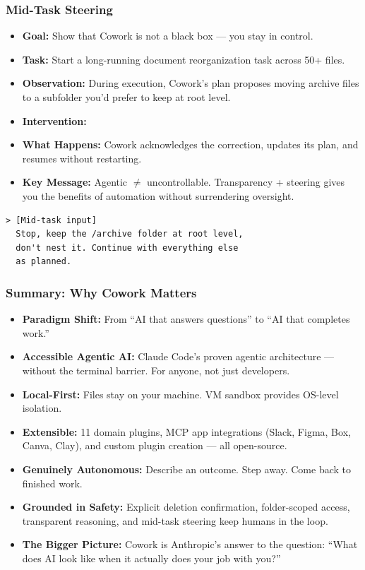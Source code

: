 \begin{frame}[fragile]\frametitle{Mid-Task Steering}
  \begin{itemize}
    \item \textbf{Goal:} Show that Cowork is not a black box — you stay in control.
    \item \textbf{Task:} Start a long-running document reorganization task across 50+ files.
    \item \textbf{Observation:} During execution, Cowork's plan proposes moving archive files to a subfolder you'd prefer to keep at root level.
    \item \textbf{Intervention:}
    \item \textbf{What Happens:} Cowork acknowledges the correction, updates its plan, and resumes without restarting.
    \item \textbf{Key Message:} Agentic $\neq$ uncontrollable. Transparency + steering gives you the benefits of automation without surrendering oversight.
  \end{itemize}
\begin{lstlisting}
> [Mid-task input]
  Stop, keep the /archive folder at root level,
  don't nest it. Continue with everything else
  as planned.
\end{lstlisting}
\end{frame}


\begin{frame}[fragile]\frametitle{Summary: Why Cowork Matters}
  \begin{itemize}
    \item \textbf{Paradigm Shift:} From ``AI that answers questions'' to ``AI that completes work.''
    \item \textbf{Accessible Agentic AI:} Claude Code's proven agentic architecture — without the terminal barrier. For anyone, not just developers.
    \item \textbf{Local-First:} Files stay on your machine. VM sandbox provides OS-level isolation.
    \item \textbf{Extensible:} 11 domain plugins, MCP app integrations (Slack, Figma, Box, Canva, Clay), and custom plugin creation — all open-source.
    \item \textbf{Genuinely Autonomous:} Describe an outcome. Step away. Come back to finished work.
    \item \textbf{Grounded in Safety:} Explicit deletion confirmation, folder-scoped access, transparent reasoning, and mid-task steering keep humans in the loop.
    \item \textbf{The Bigger Picture:} Cowork is Anthropic's answer to the question: ``What does AI look like when it actually does your job with you?''
  \end{itemize}
\end{frame}

